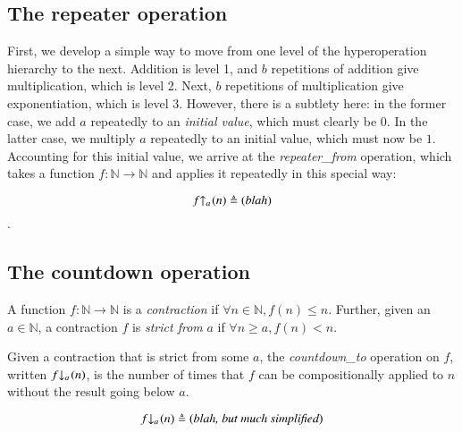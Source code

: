 

\iffalse
In this section we build the inverse Ackermann hierarchy, 
defining and proving the inverse relationship between 
this hierarchy and the Ackermann hierarchy.
\fi

\subsection{The repeater operation}

First, we develop a simple way to move 
from one level of the hyperoperation hierarchy to the
next. Addition is level 1, and $b$ repetitions of addition
give multiplication, which is level 2. Next, $b$ repetitions of 
multiplication give exponentiation, which is level 3. However, 
there is a subtlety here: in the former case, we add $a$ 
repeatedly to an \textit{initial value}, which must clearly be $0$. 
In the latter case, we multiply $a$ repeatedly to an initial value, 
which must now be $1$. Accounting for this initial value, we arrive at
the \textit{repeater\_from} operation, which takes a function 
$f: \mathbb{N} \to \mathbb{N}$ and applies it repeatedly in this special way:

$$\rf{f}{a}(n) \triangleq (\textit{blah})$$.

\subsection{The countdown operation}

\begin{defn} \label{defn: contracting}
A function $f : \mathbb{N} \to \mathbb{N}$ is a
\textit{contraction} if $\forall n \in \mathbb{N}, f(n) \le n$. 
Further, given an $a \in \mathbb{N}$, a contraction  
$f$ is \textit{strict from} 
$a$ if $\forall n \ge a, f(n) < n$.
\end{defn}

\begin{defn} \label{defn: countdown}
Given a contraction that is strict from some $a$, 
the \textit{countdown\_to} operation on $f$, 
written $\cdt{f}{a}(n)$, is the number of times
that $f$ can be compositionally applied to $n$
without the result going below $a$. 

\begin{equation} \label{eq: countdown}
\cdt{f}{a}( n ) \triangleq (\textit{blah, but much simplified})
\end{equation}
\end{defn}

